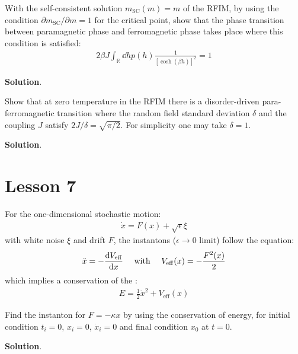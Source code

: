 \documentclass[../template.tex]{subfiles}
\begin{document}
\begin{exo}
    With the self-consistent solution $m_{\mathrm{SC} }(m) = m$ of the RFIM, by using the condition $\partial m_{\mathrm{SC} }/\partial m=1$ for the critical point, show that the phase transition between paramagnetic phase and ferromagnetic phase takes place where this condition is satisfied:
    \begin{align*}
        2 \beta J \int_{\mathbb{R}} \dd{h} p(h) \frac{1}{[\cosh(\beta h)]^2} = 1 
    \end{align*}
    
    \medskip

    \textbf{Solution}. 
\end{exo}

\begin{exo}
    Show that at zero temperature in the RFIM there is a disorder-driven para-ferromagnetic transition where the random field standard deviation $\delta$ and the coupling $J$ satisfy $2J/\delta = \sqrt{\pi/2}$. For simplicity one may take $\delta=1$.

    \medskip

    \textbf{Solution}. 
\end{exo}

\chapter{Lesson 7}
For the one-dimensional stochastic motion:
\begin{align*}
    \dot{x} = F(x) + \sqrt{\epsilon} \xi
\end{align*}
with white noise $\xi$ and drift $F$, the instantons ($\epsilon \to 0$ limit) follow the equation:
\begin{align*}
    \ddot{x} = -\dv{V_{\mathrm{eff} }}{x}\quad \text{ with } \quad V_{\mathrm{eff} }(x) = -\frac{F^2(x)}{2} 
\end{align*}
which implies a conservation of the :
\begin{align*}
    E = \frac{1}{2} \dot{x}^2 + V_{\mathrm{eff} }(x) 
\end{align*}

\begin{exo}
    Find the instanton for $F = - \kappa x$ by using the conservation of energy, for initial condition $t_i = 0$, $x_i=0$, $\dot{x}_i = 0$ and final condition $x_0$ at $t=0$.

    \medskip

    \textbf{Solution}. 
\end{exo}
\end{document}

